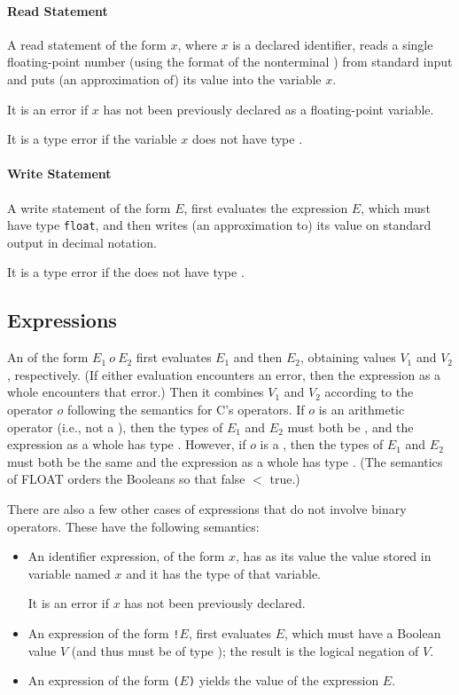 \documentclass[11pt]{article}
\begin{document}
\paragraph{Read Statement}

A read statement of the form  $x$, where $x$ is a declared
 identifier, reads a single floating-point
number
(using the format of the nonterminal )
from standard input
and puts (an approximation of) its value into the variable $x$.

It is an error if $x$ has not been previously declared as a
floating-point variable.

It is a type error if the variable $x$ does not have type .

\paragraph{Write Statement}

A write statement of the form  $E$,
first evaluates the expression $E$,
which must have type \lstinline!float!,
and then writes (an approximation to)
its value on standard output in decimal notation.

It is a type error if the  does not have type .

\subsection{Expressions}

An  of the form $E_1 \:o\: E_2$
first evaluates $E_1$ and then $E_2$, obtaining values $V_1$
and $V_2$, respectively.
(If either evaluation encounters an error, then the expression as a
whole encounters that error.)
Then it combines $V_1$ and $V_2$ according to the operator
$o$ following the semantics for C's operators.
If $o$ is an arithmetic operator (i.e., not a ),
then the types of $E_1$ and $E_2$ must both be ,
and the expression as a whole has type .
However, if $o$ is a , then the types of $E_1$ and $E_2$ must
both be the same and the expression as a whole has type .
(The semantics of FLOAT orders the Booleans so that false $<$ true.)

There are also a few other cases of expressions that do not involve
binary operators. These have the following semantics:

\begin{itemize}
\item
  An identifier expression, of the form $x$,
  has as its value the value stored in variable named $x$
  and it has the type of that variable.

  It is an error if $x$ has not been previously declared.
\item
  An expression of the form \texttt{!}$E$,
  first evaluates $E$, which must have a Boolean value $V$
  (and thus must be of type );
  the result is the logical negation of $V$.

\item
  An expression of the form \texttt{(}$E$\texttt{)} yields the value
  of the expression $E$.
\end{itemize}
\end{document}
